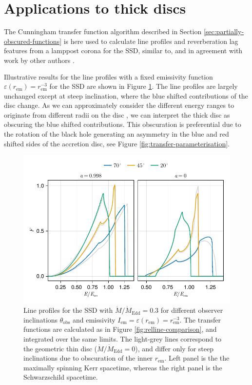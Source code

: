 \documentclass[fleqn,usenatbib]{mnras}
\newcommand{\rhoem}{r_\text{em}}
\begin{document}
\section{Applications to thick discs}
\label{sec:applications}

The Cunningham transfer function algorithm described in Section
\ref{sec:partially-obscured-functions} is here used to calculate line profiles
and reverberation lag features from a lamppost corona for the SSD, similar to,
and in agreement with work by other authors
\citep{taylor_exploring_2018,taylor_x-ray_2018}.

Illustrative results for the line profiles with a fixed emissivity function
$\varepsilon(\rhoem) = \rhoem^{-3}$ for the SSD are shown in Figure
\ref{fig:line-profile-ssd}. The line profiles are largely unchanged except at
steep inclination, where the blue shifted contributions of the disc change.  As
we can approximately consider the different energy ranges to originate from
different radii on the disc \cite{gates_on_2024}, we can interpret the thick
disc as obscuring the blue shifted contributions. This obscuration is
preferential due to the rotation of the black hole generating an asymmetry in
the blue and red shifted sides of the accretion disc, see Figure
\ref{fig:transfer-parameterisation}.

\begin{figure}
    \centering
    \includegraphics[width=0.99\columnwidth]{figures/lineprofiles.ssd.pdf}
    \caption{Line profiles for the SSD with $\dot{M} / \dot{M}_\text{Edd} = 0.3$ for different observer inclinations $\theta_\text{obs}$ and emissivity $I_\text{em} = \varepsilon(\rhoem) = \rhoem^{-3}$. The transfer functions are calculated as in Figure \ref{fig:relline-comparison}, and integrated over the same limits. The light-grey lines correspond to the geometric thin disc ($\dot{M} / \dot{M}_\text{Edd} = 0$), and differ only for steep inclinations due to obscuration of the inner $\rhoem$. Left panel is the the maximally spinning Kerr spacetime, whereas the right panel is the Schwarzschild spacetime.}
    \label{fig:line-profile-ssd}
\end{figure}
\end{document}
